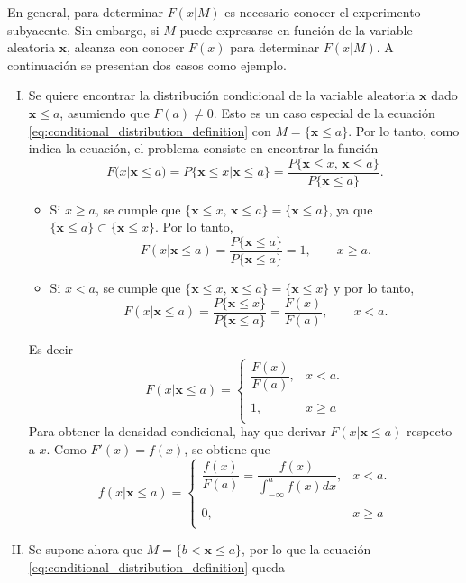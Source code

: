 \documentclass[a4paper]{report}
\newcommand{\x}{\mathbf{x}}
\begin{document}
En general, para determinar \(F(x|M)\) es necesario conocer el experimento subyacente. Sin embargo, si \(M\) puede expresarse en función de la variable aleatoria \(\x\), alcanza con conocer \(F(x)\) para determinar \(F(x|M)\). A continuación se presentan dos casos como ejemplo.
\begin{enumerate}[I.]
 \item Se quiere encontrar la distribución condicional de la variable aleatoria \(\x\) dado \(\x\leq a\), asumiendo que \(F(a)\neq 0\). Esto es un caso especial de la ecuación \ref{eq:conditional_distribution_definition} con \(M=\{\x\leq a\}\). Por lo tanto, como indica la ecuación, el problema consiste en encontrar la función
 \[
  F(x|\x\leq a)=P\{\x\leq x|\x\leq a\}=\frac{P\{\x\leq x,\,\x\leq a\}}{P\{\x\leq a\}}.
 \]
 \begin{itemize}
  \item Si \(x\geq a\), se cumple que \(\{\x\leq x,\,\x\leq a\}=\{\x\leq a\}\), ya que \(\{\x\leq a\}\subset\{\x\leq x\}\). Por lo tanto,
 \[
  F(x|\x\leq a)=\frac{P\{\x\leq a\}}{P\{\x\leq a\}}=1,\qquad x\geq a.
 \]
 \item Si \(x < a\), se cumple que \(\{\x\leq x,\,\x\leq a\}=\{\x\leq x\}\) y por lo tanto,
 \[
  F(x|\x\leq a)=\frac{P\{\x\leq x\}}{P\{\x\leq a\}}=\frac{F(x)}{F(a)},\qquad x<a.
 \]
 \end{itemize}
 Es decir
 \begin{equation}\label{eq:rv_conditional_distribution_x_leq_a}
 F(x|\x\leq a)=
 \left\{\begin{array}{ll}
 \dfrac{F(x)}{F(a)}, & x<a.\\
  \\
  1, & x\geq a \\
 \end{array} \right.
 \end{equation}
 Para obtener la densidad condicional, hay que derivar \(F(x|\x\leq a)\) respecto a \(x\). Como \(F'(x)=f(x)\), se obtiene que
 \begin{equation}\label{eq:rv_conditional_density_x_leq_a}
   f(x|\x\leq a)=
 \left\{\begin{array}{ll}
 \dfrac{f(x)}{F(a)}=\dfrac{f(x)}{\int_{-\infty}^{a}f(x)dx}, & x<a.\\
  \\
  0, & x\geq a \\
 \end{array} \right.
 \end{equation}
 \item Se supone ahora que \(M=\{b<\x\leq a\}\), por lo que la ecuación \ref{eq:conditional_distribution_definition} queda

\end{enumerate}
\end{document}
